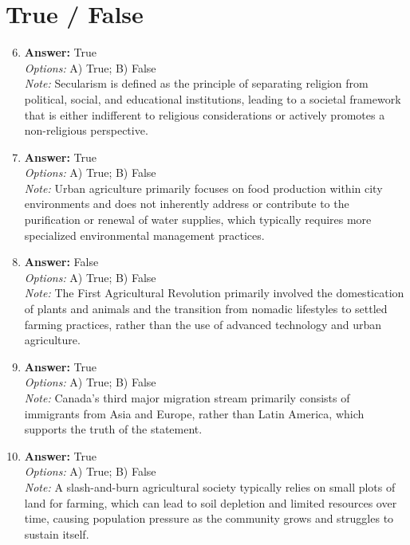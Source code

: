 \documentclass[12pt]{article}
\begin{document}
\section*{True / False}
\begin{enumerate}[label=\arabic*.]
\setcounter{enumi}{5}
\item \textbf{Answer:} True
\\ \textit{Options:} A) True; B) False
\\ \textit{Note:} Secularism is defined as the principle of separating religion from political, social, and educational institutions, leading to a societal framework that is either indifferent to religious considerations or actively promotes a non-religious perspective.
\item \textbf{Answer:} True
\\ \textit{Options:} A) True; B) False
\\ \textit{Note:} Urban agriculture primarily focuses on food production within city environments and does not inherently address or contribute to the purification or renewal of water supplies, which typically requires more specialized environmental management practices.
\item \textbf{Answer:} False
\\ \textit{Options:} A) True; B) False
\\ \textit{Note:} The First Agricultural Revolution primarily involved the domestication of plants and animals and the transition from nomadic lifestyles to settled farming practices, rather than the use of advanced technology and urban agriculture.
\item \textbf{Answer:} True
\\ \textit{Options:} A) True; B) False
\\ \textit{Note:} Canada's third major migration stream primarily consists of immigrants from Asia and Europe, rather than Latin America, which supports the truth of the statement.
\item \textbf{Answer:} True
\\ \textit{Options:} A) True; B) False
\\ \textit{Note:} A slash-and-burn agricultural society typically relies on small plots of land for farming, which can lead to soil depletion and limited resources over time, causing population pressure as the community grows and struggles to sustain itself.
\end{enumerate}
\end{document}

